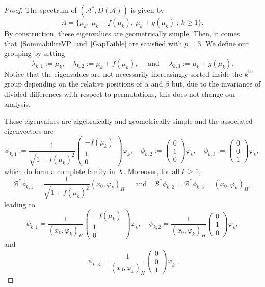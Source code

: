 \documentclass[AHL,Unicode,longabstracts]{cedram}
\newcommand\A{\mathcal{A}}
\newcommand\As{\mathcal{A}^*}
\newcommand\Bs{\mathcal{B}^*}
\newcommand{\DA}{D(\A)}
\newcommand{\psH}[2]{\left(#1, #2 \right)_H}
\begin{document}
\begin{proof}
The spectrum of $(\As, \DA)$ is given by
\[
\Lambda = \{ \mu_k, \: \mu_k + f(\mu_k), \: \mu_k+g(\mu_k) \: ; \: k \geq 1\}.
\]
By construction, these eigenvalues are geometrically simple. Then, it comes that~\eqref{SommabiliteVP} and~\eqref{GapFaible} are satisfied with $p=3$. We define our grouping by setting
\[
\lambda_{k,1}:=\mu_k, \quad \lambda_{k,2}:=\mu_k+f(\mu_k), \quad \text{ and } \quad \lambda_{k,3} := \mu_k + g(\mu_k).
\]
Notice that the eigenvalues are not necessarily increasingly sorted inside the $k^{\text{th}}$ group depending on the relative positions of $\alpha$ and $\beta$ but, due to the invariance of divided differences with respect to permutations, this does not change our analysis.

These eigenvalues are algebraically and geometrically simple and the associated eigenvectors are
\[
\phi_{k,1} := \frac{1}{\sqrt{1+f(\mu_k)^2}}
\begin{pmatrix} -f(\mu_k) \\1\\0
\end{pmatrix} \varphi_k, \quad
\phi_{k,2} :=
\begin{pmatrix} 0\\1\\0
\end{pmatrix} \varphi_k, \quad
\phi_{k,3} :=
\begin{pmatrix} 0\\0\\1
\end{pmatrix} \varphi_k,
\]
which do form a complete family in $X$. Moreover, for all $k \geq 1$,
\[
\Bs \phi_{k,1}= \frac{1}{\sqrt{1+f(\mu_k)^2}} \psH{x_0}{\varphi_k},
\quad \text{and} \quad
\Bs \phi_{k,2}= \Bs \phi_{k,3} = \psH{x_0}{\varphi_k},
\]
leading to
\[
\psi_{k,1} = \frac{1}{\psH{x_0}{\varphi_k}}
\begin{pmatrix}
-f(\mu_k) \\1\\0
\end{pmatrix} \varphi_k,
\quad
\psi_{k,2} = \frac{1}{\psH{x_0}{\varphi_k}}
\begin{pmatrix}
0\\1\\0
\end{pmatrix} \varphi_k,
\]
and
\[
\psi_{k,3} = \frac{1}{\psH{x_0}{\varphi_k}}
\begin{pmatrix}
0\\0\\1
\end{pmatrix} \varphi_k.
\]
\end{proof}
\end{document}
